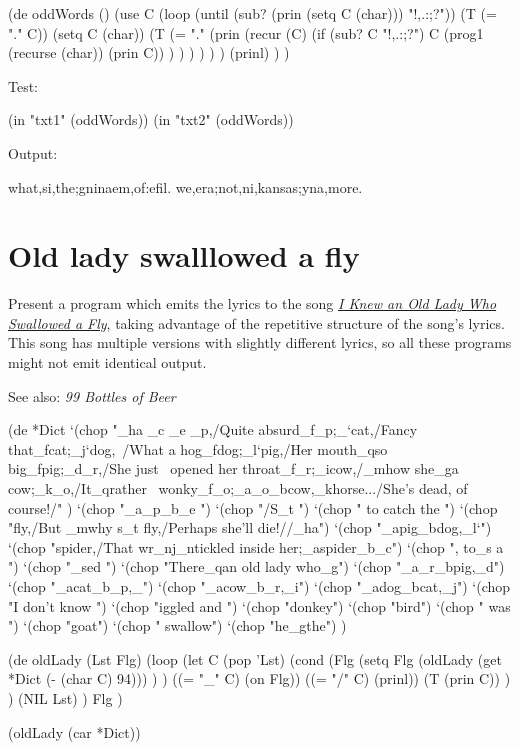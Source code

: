 \begin{wideverbatim}

(de oddWords ()
   (use C
      (loop
         (until (sub? (prin (setq C (char))) "!,.:;?"))
         (T (= "." C))
         (setq C (char))
         (T
            (= "."
               (prin
                  (recur (C)
                     (if (sub? C "!,.:;?")
                        C
                        (prog1 (recurse (char)) (prin C)) ) ) ) ) ) )
   (prinl) ) )

Test:

(in "txt1" (oddWords))
(in "txt2" (oddWords))

Output:

what,si,the;gninaem,of:efil.
we,era;not,ni,kansas;yna,more.

\end{wideverbatim}

\pagebreak{}
\section*{Old lady swalllowed a fly}

Present a program which emits the lyrics to the song
\emph{\href{http://en.wikipedia.org/wiki/There\_Was\_an\_Old\_Lady\_Who\_Swallowed\_a\_Fly}{I
    Knew an Old Lady Who Swallowed a Fly}}, taking advantage of the
repetitive structure of the song's lyrics. This song has multiple
versions with slightly different lyrics, so all these programs might
not emit identical output.

See also: \emph{99 Bottles of Beer}

\begin{wideverbatim}



(de *Dict
   `(chop
      "_ha _c _e _p,/Quite absurd_f_p;_`cat,/Fancy that_fcat;_j`dog,\
         /What a hog_fdog;_l`pig,/Her mouth_qso big_fpig;_d_r,/She just \
         opened her throat_f_r;_icow,/_mhow she_ga cow;_k_o,/It_qrather \
         wonky_f_o;_a_o_bcow,_khorse.../She's dead, of course!/" )
   `(chop "_a_p_b_e ")
   `(chop "/S_t ")
   `(chop " to catch the ")
   `(chop "fly,/But _mwhy s_t fly,/Perhaps she'll die!//_ha")
   `(chop "_apig_bdog,_l`")
   `(chop "spider,/That wr_nj_ntickled inside her;_aspider_b_c")
   `(chop ", to_s a ")
   `(chop "_sed ")
   `(chop "There_qan old lady who_g")
   `(chop "_a_r_bpig,_d")
   `(chop "_acat_b_p,_")
   `(chop "_acow_b_r,_i")
   `(chop "_adog_bcat,_j")
   `(chop "I don't know ")
   `(chop "iggled and ")
   `(chop "donkey")
   `(chop "bird")
   `(chop " was ")
   `(chop "goat")
   `(chop " swallow")
   `(chop "he_gthe") )

(de oldLady (Lst Flg)
   (loop
      (let C (pop 'Lst)
         (cond
            (Flg
               (setq Flg
                  (oldLady (get *Dict (- (char C) 94))) ) )
            ((= "_" C) (on Flg))
            ((= "/" C) (prinl))
            (T (prin C)) ) )
      (NIL Lst) )
   Flg )

(oldLady (car *Dict))

\end{wideverbatim}

